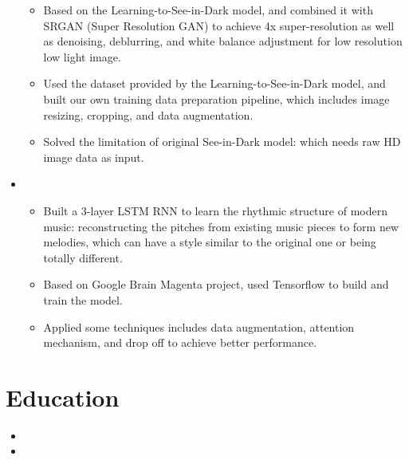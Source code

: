 \documentclass[12pt,a4paper,sans]{moderncv}        %
\begin{document}
\begin{itemize}
{\begin{itemize}
\item{Based on the Learning-to-See-in-Dark model, and combined it with SRGAN (Super Resolution GAN) to achieve 4x super-resolution as well as denoising, deblurring, and white balance adjustment for low resolution low light image.}
\vspace{3pt}
\item{Used the dataset provided by the Learning-to-See-in-Dark model, and built our own training data preparation pipeline, which includes image resizing, cropping, and data augmentation.}
\vspace{3pt}
\item{Solved the limitation of original See-in-Dark model: which needs raw HD image data as input.}

\end{itemize}}

\vspace{14pt}

\item{

\begin{itemize}
\item{Built a 3-layer LSTM RNN to learn the rhythmic structure of modern music: reconstructing the pitches from existing music pieces to form new melodies, which can have a style similar to the original one or being totally different.}
\vspace{3pt}
\item{Based on Google Brain Magenta project, used Tensorflow to build and train the model.}
\vspace{3pt}
\item{Applied some techniques includes data augmentation, attention mechanism, and drop off to achieve better performance.}
\end{itemize}}

\end{itemize}
\vspace{8pt}

\section{Education}

\vspace{6pt}

\begin{itemize}


\item{}
\vspace{3pt}

\item{}

\end{itemize}
\vspace{8pt}
\end{document}
